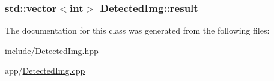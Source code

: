 \subsubsection[{\texorpdfstring{result}{result}}]{\setlength{\rightskip}{0pt plus 5cm}std\+::vector$<$int$>$ Detected\+Img\+::result\hspace{0.3cm}{\ttfamily [private]}}\hypertarget{classDetectedImg_a498ad454ddc09681abfef4b6ac1da3a1}{}\label{classDetectedImg_a498ad454ddc09681abfef4b6ac1da3a1}


The documentation for this class was generated from the following files\+:\begin{DoxyCompactItemize}
\item 
include/\hyperlink{DetectedImg_8hpp}{Detected\+Img.\+hpp}\item 
app/\hyperlink{DetectedImg_8cpp}{Detected\+Img.\+cpp}\end{DoxyCompactItemize}
